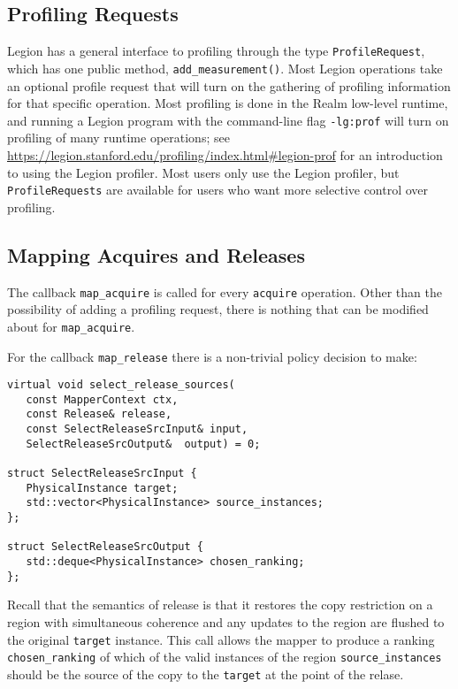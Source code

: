 \subsection{Profiling Requests}
\label{subsec:mapping:profiling}

Legion has a general interface to profiling through the type {\tt ProfileRequest}, which has one public method, {\tt add\_measurement()}.
Most Legion operations take an optional profile request that will turn on the gathering of profiling information for that specific operation.
Most profiling is done in the Realm low-level runtime, and running a Legion program with the command-line flag {\tt -lg:prof} will turn on
profiling of many runtime operations; see \url{https://legion.stanford.edu/profiling/index.html#legion-prof} for an introduction to using
the Legion profiler.  Most users only use the Legion profiler, but {\tt ProfileRequests} are available for users who want more
selective control over profiling.


\subsection{Mapping Acquires and Releases}
\label{subsec:mapping:acquires}

The callback {\tt map\_acquire} is called for every {\tt acquire} operation.  Other than the possibility of adding a profiling request, there
is nothing that can be modified about for {\tt map\_acquire}.

For the callback {\tt map\_release} there is a non-trivial policy decision to make:
\begin{lstlisting}
virtual void select_release_sources(
   const MapperContext ctx,
   const Release& release,
   const SelectReleaseSrcInput& input,
   SelectReleaseSrcOutput&  output) = 0;

struct SelectReleaseSrcInput {
   PhysicalInstance target;
   std::vector<PhysicalInstance> source_instances;
};

struct SelectReleaseSrcOutput {
   std::deque<PhysicalInstance> chosen_ranking;
};
\end{lstlisting}
Recall that the semantics of release is that it restores the copy restriction on a region with simultaneous coherence and any updates
to the region are flushed to the original {\tt target} instance.  This call allows the mapper to produce a ranking {\tt chosen\_ranking} of
which of the valid instances of the region {\tt source\_instances} should be the source of the copy to the {\tt target} at the point of the relase.


